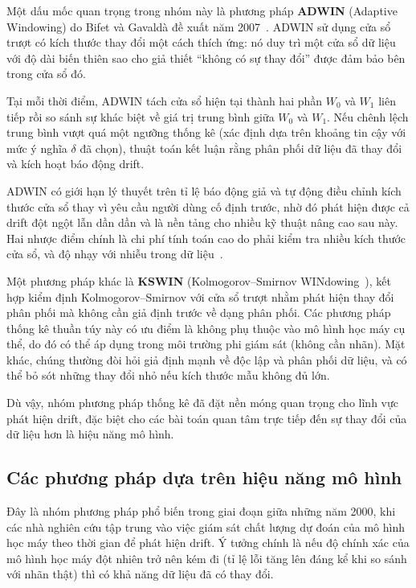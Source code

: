 Một dấu mốc quan trọng trong nhóm này là phương pháp \textbf{ADWIN} (Adaptive Windowing) do Bifet và Gavaldà đề xuất
năm 2007~\cite{bifet2007learning}. ADWIN sử dụng cửa sổ trượt có kích thước thay đổi một cách thích ứng: nó duy trì
một cửa sổ dữ liệu với độ dài biến thiên sao cho giả thiết ``không có sự thay đổi'' được đảm bảo bên trong cửa sổ đó.

Tại mỗi thời điểm, ADWIN tách cửa sổ hiện tại thành hai phần $W_0$ và $W_1$ liên tiếp rồi so sánh
sự khác biệt về giá trị trung bình giữa $W_0$ và $W_1$. Nếu chênh lệch trung bình vượt quá một ngưỡng thống kê (xác định
dựa trên khoảng tin cậy với mức ý nghĩa $\delta$ đã chọn), thuật toán kết luận rằng phân phối dữ liệu đã thay đổi và kích
hoạt báo động drift.

ADWIN có giới hạn lý thuyết trên tỉ lệ báo động giả và tự động điều chỉnh kích thước cửa sổ thay vì yêu cầu người dùng cố định trước, nhờ đó phát hiện được cả drift đột ngột lẫn dần dần và là nền tảng cho nhiều kỹ thuật nâng cao sau này. Hai nhược điểm chính là chi phí tính toán cao do phải kiểm tra nhiều kích thước cửa sổ, và độ nhạy với nhiễu trong dữ liệu~\cite{hinder2024survey_partA}.

Một phương pháp khác là \textbf{KSWIN} (Kolmogorov–Smirnov WINdowing~\cite{raab2020reactive}), kết hợp kiểm định Kolmogorov–Smirnov với cửa
sổ trượt nhằm phát hiện thay đổi phân phối mà không cần giả định trước về dạng phân phối. Các phương pháp thống kê thuần túy này có ưu điểm là không phụ
thuộc vào mô hình học máy cụ thể, do đó có thể áp dụng trong môi trường phi giám sát (không cần nhãn). Mặt khác, chúng thường đòi
hỏi giả định mạnh về độc lập và phân phối dữ liệu, và có thể bỏ sót những thay đổi nhỏ nếu kích thước mẫu không đủ lớn.

Dù vậy, nhóm phương pháp thống kê đã đặt nền móng quan trọng cho lĩnh vực phát hiện drift, đặc biệt cho các bài toán quan tâm trực tiếp đến
sự thay đổi của dữ liệu hơn là hiệu năng mô hình.

\subsection{Các phương pháp dựa trên hiệu năng mô hình}
Đây là nhóm phương pháp phổ biến trong giai đoạn giữa những năm 2000, khi các nhà nghiên cứu tập trung vào việc giám sát chất
lượng dự đoán của mô hình học máy theo thời gian để phát hiện drift. Ý tưởng chính là nếu độ chính xác của mô hình học máy đột
nhiên trở nên kém đi (tỉ lệ lỗi tăng lên đáng kể khi so sánh với nhãn thật) thì có khả năng dữ liệu đã có thay đổi.


